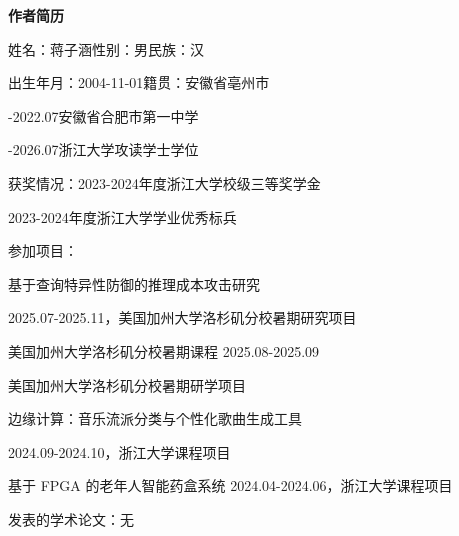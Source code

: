 {
\newpage
{}
{}
\begin{center}
  \bfseries \vspace{0.5ex}作者简历\vspace{0.5ex}
\end{center}

\noindent 姓名：蒋子涵\hspace{1em}性别：男\hspace{1em}民族：汉\par
\noindent 出生年月：2004-11-01\hspace{1em}籍贯：安徽省亳州市\par\par
{}-2022.07\hspace{2em}安徽省合肥市第一中学\par
{}-2026.07\hspace{2em}浙江大学攻读学士学位\par
\noindent 获奖情况：2023-2024年度浙江大学校级三等奖学金\par
\hspace{6.5em}2023-2024年度浙江大学学业优秀标兵\par
\noindent 参加项目：\par
\hspace{4em}基于查询特异性防御的推理成本攻击研究\par
\hspace{4em}2025.07-2025.11，美国加州大学洛杉矶分校暑期研究项目\par
\hspace{4em}美国加州大学洛杉矶分校暑期课程 2025.08-2025.09\par
\hspace{4em}美国加州大学洛杉矶分校暑期研学项目\par
\hspace{4em}边缘计算：音乐流派分类与个性化歌曲生成工具\par
\hspace{4em}2024.09-2024.10，浙江大学课程项目\par
\hspace{4em}基于 FPGA 的老年人智能药盒系统 2024.04-2024.06，浙江大学课程项目\par
\noindent 发表的学术论文：无\par
}